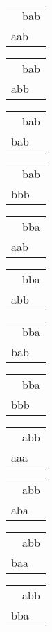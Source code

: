 \begin{tabular}{|l|} \hline
\ \ bab \\
aab\ \  \\
\hline
\end{tabular} 
\begin{tabular}{|l|} \hline
\ \ bab \\
abb\ \  \\
\hline
\end{tabular} 
\begin{tabular}{|l|} \hline
\ \ bab \\
bab\ \  \\
\hline
\end{tabular} 
\begin{tabular}{|l|} \hline
\ \ bab \\
bbb\ \  \\
\hline
\end{tabular} 
\begin{tabular}{|l|} \hline
\ \ bba \\
aab\ \  \\
\hline
\end{tabular} 
\begin{tabular}{|l|} \hline
\ \ bba \\
abb\ \  \\
\hline
\end{tabular} 
\begin{tabular}{|l|} \hline
\ \ bba \\
bab\ \  \\
\hline
\end{tabular} 
\begin{tabular}{|l|} \hline
\ \ bba \\
bbb\ \  \\
\hline
\end{tabular} 
\begin{tabular}{|l|} \hline
\ \ abb \\
aaa\ \  \\
\hline
\end{tabular} 
\begin{tabular}{|l|} \hline
\ \ abb \\
aba\ \  \\
\hline
\end{tabular} 
\begin{tabular}{|l|} \hline
\ \ abb \\
baa\ \  \\
\hline
\end{tabular} 
\begin{tabular}{|l|} \hline
\ \ abb \\
bba\ \  \\
\hline
\end{tabular} 
